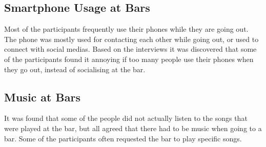 \subsection{Smartphone Usage at Bars}
Most of the participants frequently use their phones while they are going out. The phone was mostly used for contacting each other while going out, or used to connect with social medias.
Based on the interviews it was discovered that some of the participants found it annoying if too many people use their phones when they go out, instead of socialising at the bar.

\subsection{Music at Bars}
It was found that some of the people did not actually listen to the songs that were played at the bar, but all agreed that there had to be music when going to a bar. Some of the participants often requested the bar to play specific songs.
